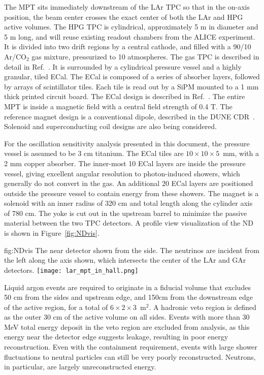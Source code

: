 The MPT sits immediately downstream of the LAr TPC so that in the on-axis position, the beam center crosses the exact center of both the LAr and HPG active volumes. The HPG TPC is cylindrical, approximately 5 m in diameter and 5 m long, and will reuse existing readout chambers from the ALICE experiment. It is divided into two drift regions by a central cathode, and filled with a 90/10 Ar/CO$_{2}$ gas mixture, pressurized to 10 atmospheres. The gas TPC is described in detail in Ref.~\cite{gasTPC}. It is surrounded by a cylindrical pressure vessel and a highly granular, tiled ECal. The ECal is composed of a series of absorber layers, followed by arrays of scintillator tiles. Each tile is read out by a SiPM mounted to a 1 mm thick printed circuit board. The ECal design is described in Ref.~\cite{CALICEecal}. The entire MPT is inside a magnetic field with a central field strength of 0.4 T. The reference magnet design is a conventional dipole, described in the DUNE CDR~\cite{Acciarri:2016ooe}. Solenoid and superconducting coil designs are also being considered.

For the oscillation sensitivity analysis presented in this document, the pressure vessel is assumed to be 3 cm titanium. The ECal tiles are $10 \times 10 \times 5$~mm, with a 2 mm copper absorber. The inner-most 10 ECal layers are inside the pressure vessel, giving excellent angular resolution to photon-induced showers, which generally do not convert in the gas. An additional 20 ECal layers are positioned outside the pressure vessel to contain energy from these showers. The magnet is a solenoid with an inner radius of 320 cm and total length along the cylinder axis of 780 cm. The yoke is cut out in the upstream barrel to minimize the passive material between the two TPC detectors. A profile view visualization of the ND is shown in Figure~\ref{fig:NDvis}.

\begin{dunefigure}[ND visualization]{fig:NDvis}
{The near detector shown from the side. The neutrinos are incident from the left along the axis shown, which intersects the center of the LAr and GAr detectors.}
 \texttt{[image: lar\_mpt\_in\_hall.png]}
\end{dunefigure}

Liquid argon events are required to originate in a fiducial volume that excludes 50 cm from the sides and upstream edge, and 150cm from the downstream edge of the active region, for a total of $6 \times 2 \times 3$~m$^{2}$. A hadronic veto region is defined as the outer 30 cm of the active volume on all sides. Events with more than 30 MeV total energy deposit in the veto region are excluded from analysis, as this energy near the detector edge suggests leakage, resulting in poor energy reconstruction. Even with the containment requirement, events with large shower fluctuations to neutral particles can still be very poorly reconstructed. Neutrons, in particular, are largely unreconstructed energy.


